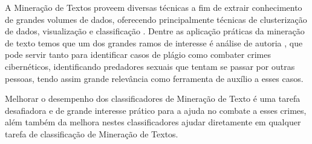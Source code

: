 
A Mineração de Textos proveem diversas técnicas a fim de extrair conhecimento de grandes volumes de dados, oferecendo principalmente técnicas de clusterização de dados, visualização e classificação \cite{Sammut2017EMLDM}. 
Dentre as aplicação práticas da mineração de texto temos que um dos grandes ramos de interesse é análise de autoria \cite{Berry2010TMAT}, que pode servir tanto para identificar casos de plágio como combater crimes cibernéticos, identificando predadores sexuais que tentam se passar por outras pessoas, tendo assim grande relevância como ferramenta de auxílio a esses casos.

Melhorar o desempenho dos classificadores de Mineração de Texto é uma tarefa desafiadora e de grande interesse prático para a ajuda no combate a esses crimes\cite{Berry2010TMAT}, além também da melhora nestes classificadores ajudar diretamente em qualquer tarefa de classificação de Mineração de Textos.